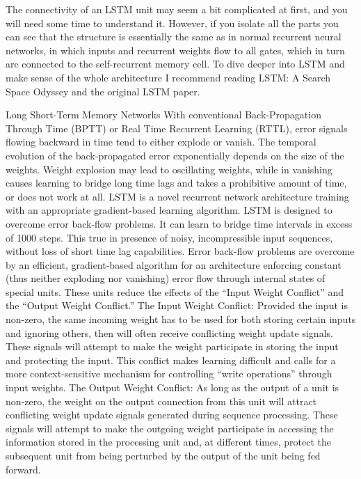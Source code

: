 The connectivity of an LSTM unit may seem a bit complicated at first, and you will need some time to understand it. However, if you isolate all the parts you can see that the structure is essentially the same as in normal recurrent neural networks, in which inputs and recurrent weights flow to all gates, which in turn are connected to the self-recurrent memory cell.
To dive deeper into LSTM and make sense of the whole architecture I recommend reading LSTM: A Search Space Odyssey and the original LSTM paper.
 
Long Short-Term Memory Networks
With conventional Back-Propagation Through Time (BPTT) or Real Time Recurrent Learning (RTTL), error signals flowing backward in time tend to either explode or vanish.
The temporal evolution of the back-propagated error exponentially depends on the size of the weights. Weight explosion may lead to oscillating weights, while in vanishing causes learning to bridge long time lags and takes a prohibitive amount of time, or does not work at all.
    LSTM is a novel recurrent network architecture training with an appropriate gradient-based learning algorithm.
    LSTM is designed to overcome error back-flow problems. It can learn to bridge time intervals in excess of 1000 steps.
    This true in presence of noisy, incompressible input sequences, without loss of short time lag capabilities.
Error back-flow problems are overcome by an efficient, gradient-based algorithm for an architecture enforcing constant (thus neither exploding nor vanishing) error flow through internal states of special units. These units reduce the effects of the “Input Weight Conflict” and the “Output Weight Conflict.”
The Input Weight Conflict: Provided the input is non-zero, the same incoming weight has to be used for both storing certain inputs and ignoring others, then will often receive conflicting weight update signals.
These signals will attempt to make the weight participate in storing the input and protecting the input. This conflict makes learning difficult and calls for a more context-sensitive mechanism for controlling “write operations” through input weights.
The Output Weight Conflict: As long as the output of a unit is non-zero, the weight on the output connection from this unit will attract conflicting weight update signals generated during sequence processing.
These signals will attempt to make the outgoing weight participate in accessing the information stored in the processing unit and, at different times, protect the subsequent unit from being perturbed by the output of the unit being fed forward.
